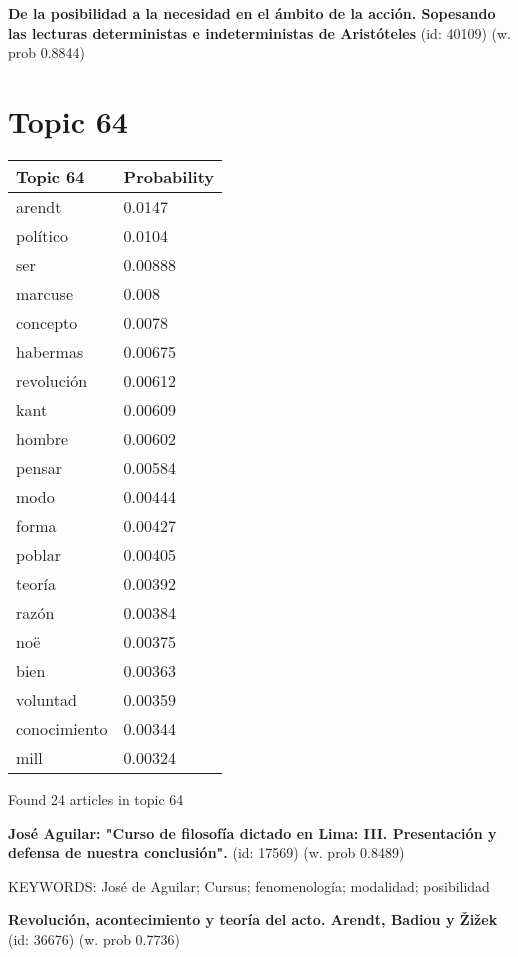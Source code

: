 \documentclass{article}
\begin{document}
\textbf{De la posibilidad a la necesidad en el ámbito de la acción.  Sopesando las lecturas deterministas e indeterministas  de Aristóteles} (id: 40109)
 (w. prob 0.8844)

\vfill
\newpage


\centering
\thispagestyle{empty}
\section*{Topic 64}\vfill
\begin{tabular}{ll}
\toprule
     Topic 64 & Probability \\
\midrule
       arendt &      0.0147 \\
     político &      0.0104 \\
          ser &     0.00888 \\
      marcuse &       0.008 \\
     concepto &      0.0078 \\
     habermas &     0.00675 \\
   revolución &     0.00612 \\
         kant &     0.00609 \\
       hombre &     0.00602 \\
       pensar &     0.00584 \\
         modo &     0.00444 \\
        forma &     0.00427 \\
       poblar &     0.00405 \\
       teoría &     0.00392 \\
        razón &     0.00384 \\
          noë &     0.00375 \\
         bien &     0.00363 \\
     voluntad &     0.00359 \\
 conocimiento &     0.00344 \\
         mill &     0.00324 \\
\bottomrule
\end{tabular}

\vfill
Found 24 articles in topic 64
\vfill

\textbf{José Aguilar: "Curso de filosofía dictado en Lima: III. Presentación y defensa de nuestra conclusión".} (id: 17569)
 (w. prob 0.8489)


KEYWORDS:
José de Aguilar; Cursus; fenomenología; modalidad; posibilidad
\vfill

\textbf{Revolución, acontecimiento y teoría del acto. Arendt, Badiou y Žižek} (id: 36676)
 (w. prob 0.7736)
\vfill
\end{document}
